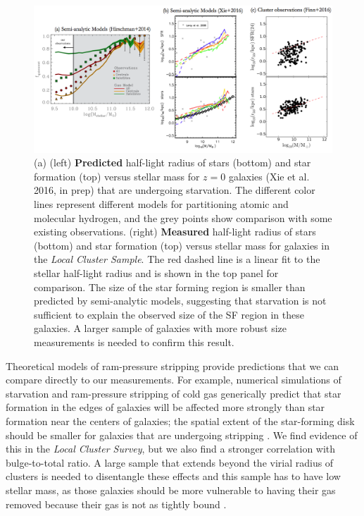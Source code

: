 \documentclass[11pt, preprint]{aastex}
\begin{document}
{\begin{figure}[h!]
\begin{center}
\includegraphics[width=\textwidth]{model-comparison.png}
\end{center}
\caption{\small (a)  (left) {\bf Predicted} half-light radius
  of stars (bottom) and star formation (top) versus stellar mass for
  $z = 0 $ galaxies (Xie et al. 2016, in prep) that are undergoing starvation.
  The different color lines represent different models for partitioning
  atomic and molecular hydrogen, and the grey points show comparison
  with some existing observations.  
(right) {\bf Measured} half-light radius of stars (bottom) and star
formation (top) versus stellar mass for galaxies in the {\it Local Cluster Sample}.  The
red dashed line is a linear fit to the stellar half-light radius and
is shown in the top panel for comparison.  The size of the star
forming region is smaller than predicted by semi-analytic models,
suggesting that starvation is not sufficient to explain the observed
size of the SF region in these galaxies.  A larger sample of galaxies
with more robust size measurements is needed to confirm this result.}
\label{lizhi_comparison}
\end{figure}

Theoretical models of ram-pressure stripping provide predictions that
we can compare directly to our measurements.
For example, numerical simulations of starvation and ram-pressure stripping of cold gas 
generically predict that star formation in the edges
of galaxies will be affected more strongly than star formation near the
centers of galaxies; the spatial extent of the star-forming disk
should be smaller for galaxies that are undergoing stripping \citep[e.g.][]{kawata08, bekki14}.
We find evidence of this in the {\it Local Cluster Survey}, but we
also find a stronger correlation with bulge-to-total ratio.  A large sample that extends beyond the virial radius of clusters is needed to disentangle these effects and this sample has to have low stellar mass, as those galaxies should be more
vulnerable to having their gas removed 
because their gas is not as tightly
bound \citep[e.g.][]{kawata08, mccarthy07, bekki14}.

}
\end{document}
